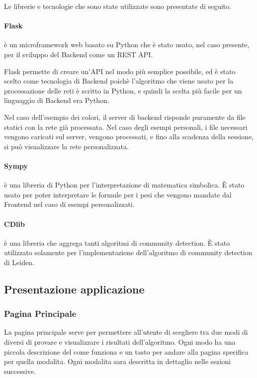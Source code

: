 \documentclass[a4paper,12pt]{report}
\begin{document}
			Le librerie e tecnologie che sono state utilizzate sono presentate di seguito.
			
			\paragraph*{Flask} è un microframework web basato su Python che è stato usato, nel caso presente, per il sviluppo del Backend come un REST API. \cite{flaskforeword}

				Flask permette di creare un’API nel modo più semplice possibile, ed è stato scelto come tecnologia di Backend poichè l’algoritmo che viene usato per la processazione delle reti è scritto in Python, e quindi la scelta più facile per un linguaggio di Backend era Python. 

				Nel caso dell’esempio dei colori, il server di backend risponde puramente da file statici con la rete già processata. Nel caso degli esempi personali, i file necessari vengono caricati sul server, vengono processati, e fino alla scadenza della sessione, si può visualizzare la rete personalizzata.

			\paragraph*{Sympy} è una libreria di Python per l’interpretazione di matematica simbolica. È stato usato per poter interpretare le formule per i pesi che vengono mandate dal Frontend nel caso di esempi personalizzati. \cite{sympy}

			\paragraph*{CDlib} è una libreria che aggrega tanti algoritmi di community detection. È stato utilizzato solamente per l’implementazione dell’algoritmo di community detection di Leiden. \cite{cdlib}
			
		\subsection{Presentazione applicazione}
			
			\subsubsection{Pagina Principale}
			La pagina principale serve per permettere all'utente di scegliere tra due modi di diversi di provare e visualizzare i risultati dell'algoritmo. Ogni modo ha una piccola descrizione del come funziona e un tasto per andare alla pagina specifica per quella modalita. Ogni modalita sara descritta in dettaglio nelle sezioni successive.
\end{document}

